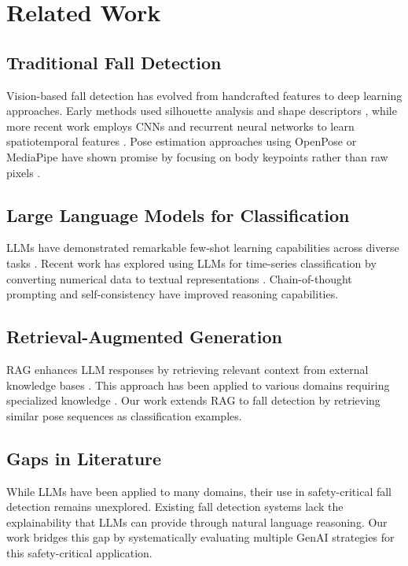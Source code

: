 \documentclass[conference]{IEEEtran}
\begin{document}
\section{Related Work}

\subsection{Traditional Fall Detection}
Vision-based fall detection has evolved from handcrafted features to deep learning approaches. Early methods used silhouette analysis and shape descriptors \cite{rougier2011robust}, while more recent work employs CNNs and recurrent neural networks to learn spatiotemporal features \cite{khan2020fall, chen2020fall}. Pose estimation approaches using OpenPose or MediaPipe have shown promise by focusing on body keypoints rather than raw pixels \cite{chen2020pose}.

\subsection{Large Language Models for Classification}
LLMs have demonstrated remarkable few-shot learning capabilities across diverse tasks \cite{brown2020language}. Recent work has explored using LLMs for time-series classification by converting numerical data to textual representations \cite{gruver2023large}. Chain-of-thought prompting \cite{wei2022chain} and self-consistency \cite{wang2022selfconsistency} have improved reasoning capabilities.

\subsection{Retrieval-Augmented Generation}
RAG enhances LLM responses by retrieving relevant context from external knowledge bases \cite{lewis2020retrieval}. This approach has been applied to various domains requiring specialized knowledge \cite{guu2020realm}. Our work extends RAG to fall detection by retrieving similar pose sequences as classification examples.

\subsection{Gaps in Literature}
While LLMs have been applied to many domains, their use in safety-critical fall detection remains unexplored. Existing fall detection systems lack the explainability that LLMs can provide through natural language reasoning. Our work bridges this gap by systematically evaluating multiple GenAI strategies for this safety-critical application.
\end{document}
